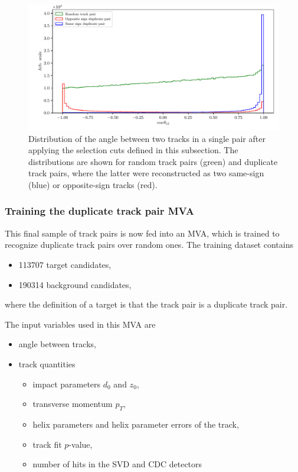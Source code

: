 \begin{figure}[H]
	\centering
	\captionsetup{width=0.8\linewidth}
	\includegraphics[width=\linewidth]{fig/ROECleanup_dup_angle_final}
	\caption{Distribution of the angle between two tracks in a single pair after applying the selection cuts defined in this subsection. The distributions are shown for random track pairs (green) and duplicate track pairs, where the latter were reconstructed as two same-sign (blue) or opposite-sign tracks (red).}
	\label{fig:ROE_dupAngleFinal}
\end{figure}

\subsubsection{Training the duplicate track pair MVA}
\label{ss:trackMVA}

This final sample of track pairs is now fed into an MVA, which is trained to recognize duplicate track pairs over random ones. The training dataset contains
\begin{itemize}
	\item 113707 target candidates,
	\item 190314 background candidates,
\end{itemize}
where the definition of a target is that the track pair is a duplicate track pair. 

The input variables used in this MVA are
\begin{itemize}
	\item angle between tracks,
	\item track quantities
	\begin{itemize}
		\item impact parameters $d_0$ and $z_0$,
		\item transverse momentum $p_T$,
		\item helix parameters and helix parameter errors of the track,
		\item track fit $p$-value,
		\item number of hits in the SVD and CDC detectors
	\end{itemize}
\end{itemize}

